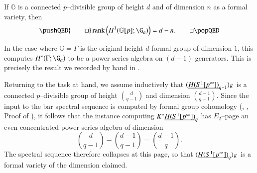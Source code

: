 \begin{lemma}
If $\mathbb G$ is a connected $p$--divisible group of height $d$ and of dimension $n$ as a formal variety, then
\[\pushQED{\qed}
\operatorname{rank}\left(H^1(\mathbb G[p]; \G_a)\right) = d - n. \qedhere
\popQED\]
\end{lemma}

\begin{remark}
In the case where $\mathbb G = \Gamma$ is the original height $d$ formal group of dimension $1$, this computes $H^*(\Gamma; \G_a)$ to be a power series algebra on $(d-1)$ generators.  This is precisely the result we recorded by hand in .
\end{remark}

\noindent Returning to the task at hand, we assume inductively that $(\underline{\smash{H(S^1[p^\infty])}}_{q-1})_K$ is a connected $p$--divisible group of height $\binom{d}{q-1}$ and dimension $\binom{d-1}{q-1}$.  Since the input to the bar spectral sequence is computed by formal group cohomology (\cite{LazarevDeformations}, \cite[Example 2.3.5]{HopkinsLurie}, Proof of ), it follows that the instance computing $K^* \underline{\smash{H(S^1[p^\infty])}}_{q}$ has $E_2$--page an even-concentrated power series algebra of dimension \[\binom{d}{q-1} - \binom{d-1}{q-1} = \binom{d-1}{q}.\]  The spectral sequence therefore collapses at this page, so that $(\underline{\smash{H(S^1[p^\infty])}}_{q})_K$ is a formal variety of the dimension claimed.

